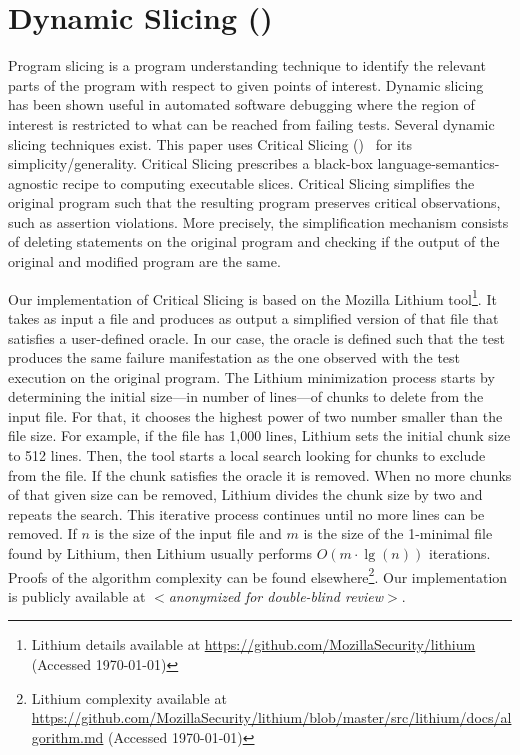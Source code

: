 \documentclass{article}
\begin{document}

\section{Dynamic Slicing (\ds{})}
\label{sec:slicing}
Program slicing is a program understanding technique to identify the
relevant parts of the program with respect to given points of
interest. Dynamic
slicing~\cite{Agrawal:1990:DPS:93542.93576}
has been shown useful in automated software debugging where the region
of interest is restricted to what can be reached from failing
tests. Several dynamic slicing techniques exist. This paper uses
Critical Slicing (\cs{})~\cite{DeMillo:1996:CSS:229000.226310} for its
simplicity/generality. Critical Slicing
prescribes a black-box language-semantics-agnostic recipe to computing
executable slices.  Critical Slicing simplifies the original
program such that the resulting program preserves critical
observations, such as assertion violations. More precisely, the
simplification mechanism consists of deleting statements on the
original program and checking if the output of the original and
modified program are the same.

Our implementation of Critical Slicing is based on the Mozilla Lithium
tool\footnote{Lithium details available at {\footnotesize\url{https://github.com/MozillaSecurity/lithium}} (Accessed \today)}. It takes as input a file
and produces as output a simplified version of that file that
satisfies a user-defined oracle. In our case, the oracle is defined
such that the test produces the same failure manifestation as the one
observed with the test execution on the original program. The
Lithium minimization process starts by determining the initial size---in
number of lines---of chunks to delete from the input file. For that,
it chooses the highest power of two number smaller than the file
size. For example, if the file has 1,000 lines, Lithium sets the
initial chunk size to 512 lines. Then, the tool starts a local search looking
for chunks to exclude from the file. If the chunk satisfies the oracle it is removed.
When no more chunks of that given size can be removed, Lithium
divides the chunk size by two and repeats the search. This iterative
process continues until no more lines can be removed.  If $n$ is the
size of the input file and $m$ is the size of the 1-minimal file found
by Lithium, then Lithium usually performs $O(m\cdot\lg(n))$
iterations. Proofs of the algorithm complexity can be found
elsewhere\footnote{Lithium complexity available at \url{https://github.com/MozillaSecurity/lithium/blob/master/src/lithium/docs/algorithm.md} (Accessed \today)}. Our implementation is publicly
available at \textit{$<$anonymized for double-blind review$>$}.
\end{document}
